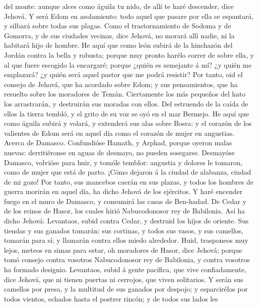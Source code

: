 del monte: aunque alces como águila tu nido, de allí te haré descender,
dice Jehová.  Y será Edom en asolamiento: todo aquel que
pasare por ella se espantará, y silbará sobre todas sus plagas.
 Como el trastornamiento de Sodoma y de Gomorra, y de sus
ciudades vecinas, dice Jehová, no morará allí nadie, ni la habitará hijo
de hombre.  He aquí que como león subirá de la hinchazón
del Jordán contra la bella y robusta; porque muy pronto harélo correr de
sobre ella, y al que fuere escogido la encargaré; porque ¿quién es
semejante á mí? ¿y quién me emplazará? ¿y quién será aquel pastor que me
podrá resistir?  Por tanto, oid el consejo de Jehová, que
ha acordado sobre Edom; y sus pensamientos, que ha resuelto sobre los
moradores de Temán. Ciertamente los más pequeños del hato los
arrastrarán, y destruirán sus moradas con ellos.  Del
estruendo de la caída de ellos la tierra tembló, y el grito de su voz se
oyó en el mar Bermejo.  He aquí que como águila subirá y
volará, y extenderá sus alas sobre Bosra: y el corazón de los valientes
de Edom será en aquel día como el corazón de mujer en angustias.
 Acerca de Damasco. Confundióse Hamath, y Arphad, porque
oyeron malas nuevas: derritiéronse en aguas de desmayo, no pueden
sosegarse.  Desmayóse Damasco, volvióse para huir, y tomóle
temblor: angustia y dolores le tomaron, como de mujer que está de parto.
 ¡Cómo dejaron á la ciudad de alabanza, ciudad de mi gozo!
 Por tanto, sus mancebos caerán en sus plazas, y todos los
hombres de guerra morirán en aquel día, ha dicho Jehová de los
ejércitos.  Y haré encender fuego en el muro de Damasco, y
consumirá las casas de Ben-hadad.  De Cedar y de los reinos
de Hasor, los cuales hirió Nabucodonosor rey de Babilonia. Así ha dicho
Jehová: Levantaos, subid contra Cedar, y destruid los hijos de oriente.
 Sus tiendas y sus ganados tomarán: sus cortinas, y todos
sus vasos, y sus camellos, tomarán para sí; y llamarán contra ellos
miedo alrededor.  Huid, trasponeos muy lejos, meteos en
simas para estar, oh moradores de Hasor, dice Jehová; porque tomó
consejo contra vosotros Nabucodonosor rey de Babilonia, y contra
vosotros ha formado designio.  Levantaos, subid á gente
pacífica, que vive confiadamente, dice Jehová, que ni tienen puertas ni
cerrojos, que viven solitarios.  Y serán sus camellos por
presa, y la multitud de sus ganados por despojo; y esparcirélos por
todos vientos, echados hasta el postrer rincón; y de todos sus lados les
